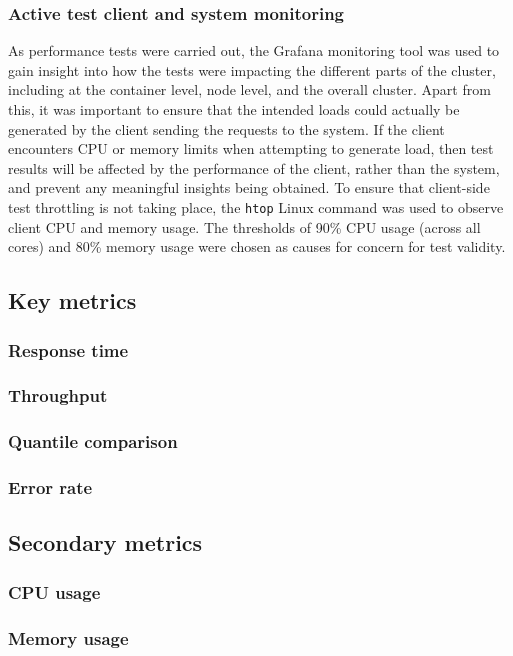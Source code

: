 \subsubsection{Active test client and system monitoring}

As performance tests were carried out, the Grafana monitoring tool was used to gain insight into how the tests were impacting the different parts of the cluster, including at the container level, node level, and the overall cluster. Apart from this, it was important to ensure that the intended loads could actually be generated by the client sending the requests to the system. If the client encounters CPU or memory limits when attempting to generate load, then test results will be affected by the performance of the client, rather than the system, and prevent any meaningful insights being obtained. To ensure that client-side test throttling is not taking place, the \verb|htop| Linux command was used to observe client CPU and memory usage. The thresholds of 90\% CPU usage (across all cores) and 80\% memory usage were chosen as causes for concern for test validity.

\subsection{Key metrics}
\subsubsection{Response time}
\subsubsection{Throughput}
\subsubsection{Quantile comparison}
\subsubsection{Error rate}
\subsection{Secondary metrics}
\subsubsection{CPU usage}
\subsubsection{Memory usage}

